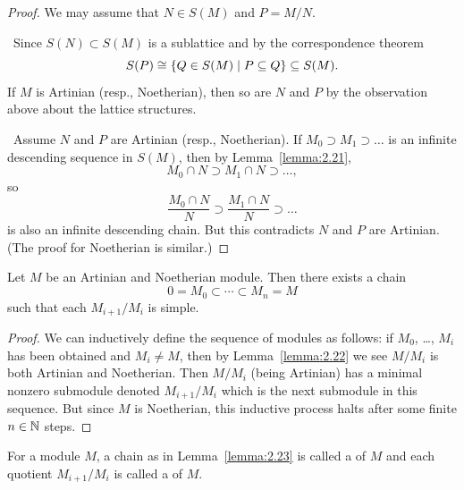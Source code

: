 \begin{proof}
We may assume that $N\in S(M)$ and $P=M/N$.

\forwardproof\ Since $S(N)\subset S(M)$ is a sublattice and by the
correspondence theorem
\begin{equation}
S(P)\cong\{Q\in S(M)\mid P\subseteq Q\}\subseteq S(M).
\end{equation}
If $M$ is Artinian (resp., Noetherian), then so are $N$ and $P$ by the
observation above about the lattice structures.

\backwardproof\ Assume $N$ and $P$ are Artinian (resp., Noetherian). If
$M_{0}\supset M_{1}\supset\dots$ is an infinite descending sequence in
$S(M)$, then by Lemma~\ref{lemma:2.21},
\begin{equation}
M_{0}\cap N\supset M_{1}\cap N\supset\dots,
\end{equation}
so
\begin{equation}
\frac{M_{0}\cap N}{N}\supset\frac{M_{1}\cap N}{N}\supset\dots
\end{equation}
is also an infinite descending chain. But this contradicts $N$ and $P$
are Artinian. (The proof for Noetherian is similar.)
\end{proof}

\begin{lemma}\label{lemma:2.23}
Let $M$ be an Artinian and Noetherian module. Then there exists a
chain
\begin{equation*}
0=M_{0}\subset\cdots\subset M_{n}=M
\end{equation*}
such that each $M_{i+1}/M_{i}$ is simple.
\end{lemma}

\begin{proof}
We can inductively define the sequence of modules as follows: if
$M_{0}$, \dots, $M_{i}$ has been obtained and $M_{i}\neq M$, then by
Lemma~\ref{lemma:2.22} we see $M/M_{i}$ is both Artinian and
Noetherian. Then $M/M_{i}$ (being Artinian) has a minimal nonzero
submodule denoted $M_{i+1}/M_{i}$ which is the next submodule in this
sequence. But since $M$ is Noetherian, this inductive process halts
after some finite $n\in\mathbb{N}$ steps.
\end{proof}

\begin{definition}
For a module $M$, a chain as in Lemma~\ref{lemma:2.23} is called a
 of $M$ and each quotient $M_{i+1}/M_{i}$
is called a  of $M$.
\end{definition}

